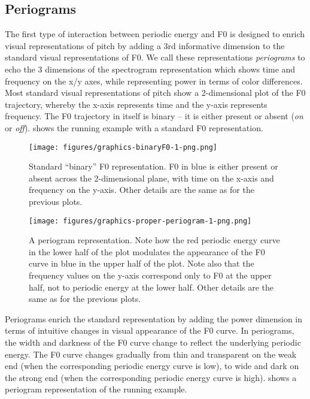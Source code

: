 \subsection{Periograms}\label{sec:periograms}

The first type of interaction between periodic energy and F0 is designed to enrich visual representations of pitch by adding a 3rd informative dimension to the standard visual representations of F0. We call these representations \emph{periograms} \citep{albert2018usingsk} to echo the 3 dimensions of the spectrogram representation which shows time and frequency on the x/y axes, while representing power in terms of color differences.
Most standard visual representations of pitch show a 2-dimensional plot of the F0 trajectory, whereby the x-axis represents time and the y-axis represents frequency. The F0 trajectory in itself is binary -- it is either present or absent (\emph{on} or \emph{off}).
 shows the running example with a standard F0 representation.



\begin{figure}
\texttt{[image: figures/graphics-binaryF0-1-png.png]} 
\caption{Standard \enquote{binary} F0 representation. F0 in blue is either present or absent across the 2-dimensional plane, with time on the x-axis and frequency on the y-axis. Other details are the same as for the previous plots.}\label{fig:binaryF0}
\end{figure}

\begin{figure}
\texttt{[image: figures/graphics-proper-periogram-1-png.png]} 
\caption{A periogram representation. Note how the red periodic energy curve in the lower half of the plot modulates the appearance of the F0 curve in blue in the upper half of the plot. Note also that the frequency values on the y-axis correspond only to F0 at the upper half, not to periodic energy at the lower half. Other details are the same as for the previous plots.}\label{fig:proper-periogram}
\end{figure}

Periograms enrich the standard representation by adding the power dimension in terms of intuitive changes in visual appearance of the F0 curve. In periograms, the width and darkness of the F0 curve change to reflect the underlying periodic energy. The F0 curve changes gradually from thin and transparent on the weak end (when the corresponding periodic energy curve is low), to wide and dark on the strong end (when the corresponding periodic energy curve is high).  shows a periogram representation of the running example.


